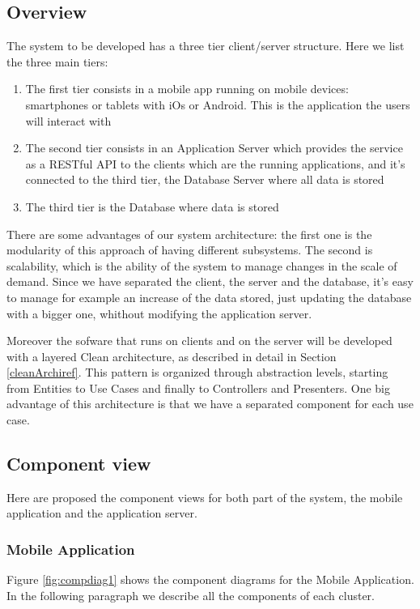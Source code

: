 \subsection{Overview}
The system to be developed has a three tier client/server structure.
Here we list the three main tiers:
\begin{enumerate}
  \item The first tier consists in a mobile app running on mobile devices: smartphones or tablets with iOs or Android. This is the application the users will interact with
  \item The second tier consists in an Application Server which provides the service as a RESTful API to the clients which are the running applications, and it's connected to the third tier, the Database Server where all data is stored
  \item The third tier is the Database where data is stored
\end{enumerate}

There are some advantages of our system architecture: the first one is the modularity of this approach of having different subsystems. The second is scalability,  which is the ability of the system to manage changes in the scale of demand. Since we have separated the client, the server and the database, it's easy to manage for example an increase of the data stored, just updating the database with a bigger one, whithout modifying the application server.

Moreover the sofware that runs on clients and on the server will be developed with a layered Clean architecture, as described in detail in Section \ref{cleanArchiref}. This pattern is organized through abstraction levels, starting from Entities to Use Cases and finally to Controllers and Presenters.
One big advantage of this architecture is that we have a separated component for each use case.

\subsection{Component view}
Here are proposed the component views for both part of the system, the mobile application and the application server.

\subsubsection{Mobile Application}
Figure \ref{fig:compdiag1} shows the component diagrams for the Mobile Application. In the following paragraph we describe all the components of each cluster.

